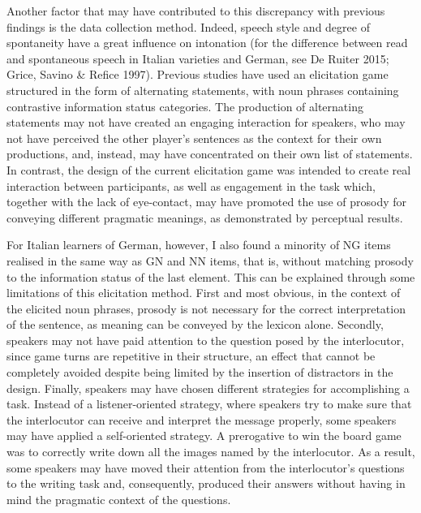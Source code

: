 \begin{styleStandard}
Another factor that may have contributed to this discrepancy with previous findings is the data collection method. Indeed, speech style and degree of spontaneity have a great influence on intonation (for the difference between read and spontaneous speech in Italian varieties and German, see De Ruiter 2015; Grice, Savino \& Refice 1997). Previous studies have used an elicitation game structured in the form of alternating statements, with noun phrases containing contrastive information status categories. The production of alternating statements may not have created an engaging interaction for speakers, who may not have perceived the other player’s sentences as the context for their own productions, and, instead, may have concentrated on their own list of statements. In contrast, the design of the current elicitation game was intended to create real interaction between participants, as well as engagement in the task which, together with the lack of eye-contact, may have promoted the use of prosody for conveying different pragmatic meanings, as demonstrated by perceptual results.
\end{styleStandard}

\begin{styleStandard}
For Italian learners of German, however, I also found a minority of NG items realised in the same way as GN and NN items, that is, without matching prosody to the information status of the last element. This can be explained through some limitations of this elicitation method. First and most obvious, in the context of the elicited noun phrases, prosody is not necessary for the correct interpretation of the sentence, as meaning can be conveyed by the lexicon alone. Secondly, speakers may not have paid attention to the question posed by the interlocutor, since game turns are repetitive in their structure, an effect that cannot be completely avoided despite being limited by the insertion of distractors in the design. Finally, speakers may have chosen different strategies for accomplishing a task. Instead of a listener-oriented strategy, where speakers try to make sure that the interlocutor can receive and interpret the message properly, some speakers may have applied a self-oriented strategy. A prerogative to win the board game was to correctly write down all the images named by the interlocutor. As a result, some speakers may have moved their attention from the interlocutor’s questions to the writing task and, consequently, produced their answers without having in mind the pragmatic context of the questions.
\end{styleStandard}

